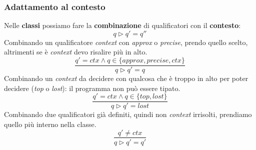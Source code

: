 \subsubsection{Adattamento al contesto}
Nelle \textbf{classi} possiamo fare la \textbf{combinazione} di qualificatori con il \textbf{contesto}:
\begin{equation}
	q\triangleright q' = q''
\end{equation}
Combinando un qualificatore \textit{context} con \textit{approx} o \textit{precise}, prendo quello scelto, altrimenti se è \textit{context} devo risalire più in alto.
\begin{equation}
	\frac{q' = ctx \land q \in \{approx, precise, ctx\}}{q \triangleright q' = q}
\end{equation}
Combinando un \textit{context} da decidere con qualcosa che è troppo in alto per poter decidere (\textit{top} o \textit{lost}): il programma non può essere tipato.
\begin{equation}
	\frac{q' = ctx \land q \in \{top, lost\}}{q \triangleright q' = lost}
\end{equation}
Combinando due qualificatori già definiti, quindi non \textit{context} irrisolti, prendiamo quello più interno nella classe.
\begin{equation}
	\frac{q' \neq ctx}{q \triangleright q' = q'}
\end{equation}
